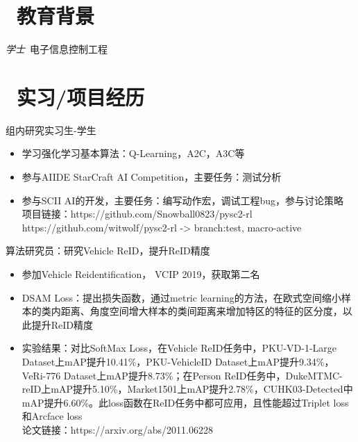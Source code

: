 \documentclass{resume}
\begin{document}


 
\section{\faGraduationCap\  教育背景}
\textit{学士}\ 电子信息控制工程

\section{\faUsers\ 实习/项目经历}
\role{实习}{Leader:兴军亮}
组内研究实习生-学生
\begin{itemize}
  \item 学习强化学习基本算法：Q-Learning，A2C，A3C等
  \item 参与AIIDE StarCraft AI Competition，主要任务：测试分析
  \item 参与SCII AI的开发，主要任务：编写动作宏，调试工程bug，参与讨论策略\\
  项目链接：https://github.com/Snowball0823/pysc2-rl\\
  https://github.com/witwolf/pysc2-rl -> branch:test, macro-active
\end{itemize}

算法研究员：研究Vehicle ReID，提升ReID精度
\begin{itemize}
  \item 参加Vehicle Reidentification， VCIP 2019，获取第二名
  \item DSAM Loss：提出损失函数，通过metric learning的方法，在欧式空间缩小样本的类内距离、角度空间增大样本的类间距离来增加特区的特征的区分度，以此提升ReID精度
  \item 实验结果：对比SoftMax Loss，在Vehicle ReID任务中，PKU-VD-1-Large Dataset上mAP提升10.41\%，PKU-VehicleID Dataset上mAP提升9.34\%，VeRi-776 Dataset上mAP提升8.73\%；在Person ReID任务中，DukeMTMC-reID上mAP提升5.10\%，Market1501上mAP提升2.78\%，CUHK03-Detected中mAP提升6.60\%。此loss函数在ReID任务中都可应用，且性能超过Triplet loss和Arcface loss\\
  论文链接：https://arxiv.org/abs/2011.06228
\end{itemize}
\end{document}
